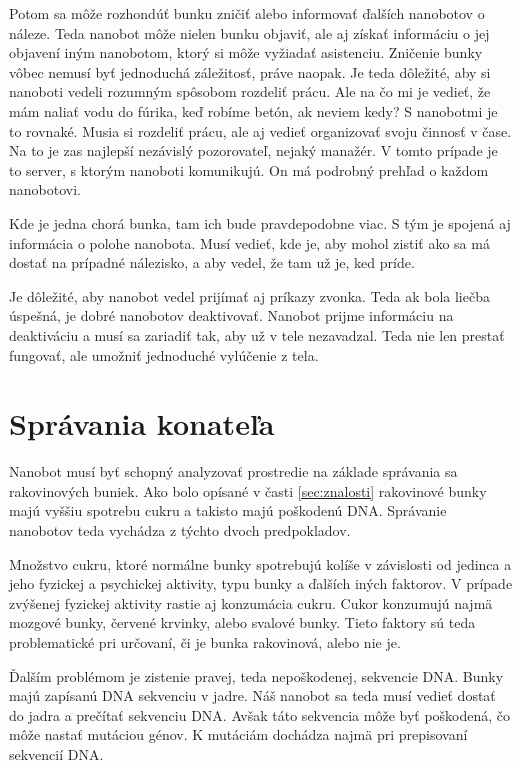 \documentclass[10pt,twoside,slovak,a4paper]{article}
\begin{document}
Potom sa môže rozhondúť bunku zničiť alebo informovať ďalších nanobotov o náleze. Teda nanobot môže nielen bunku objaviť, ale aj získať informáciu o jej objavení iným nanobotom, ktorý si môže vyžiadať asistenciu. Zničenie bunky vôbec nemusí byť jednoduchá záležitosť, práve naopak. Je teda dôležité, aby si nanoboti vedeli rozumným spôsobom rozdeliť prácu. Ale na čo mi je vedieť, že mám naliať vodu do fúrika, keď robíme betón, ak neviem kedy? S nanobotmi je to rovnaké. Musia si rozdeliť prácu, ale aj vedieť organizovať svoju činnosť v čase. Na to je zas najlepší nezávislý pozorovateľ, nejaký manažér. V tomto prípade je to server, s ktorým nanoboti komunikujú. On má podrobný prehľad o každom nanobotovi. 

Kde je jedna chorá bunka, tam ich bude pravdepodobne viac. S tým je spojená aj informácia o polohe nanobota. Musí vedieť, kde je, aby mohol zistiť ako sa má dostať na prípadné nálezisko, a aby vedel, že tam už je, ked príde.

Je dôležité, aby nanobot vedel prijímať aj príkazy zvonka. Teda ak bola liečba úspešná, je dobré nanobotov deaktivovať. Nanobot prijme informáciu na deaktiváciu a musí sa zariadiť tak, aby už v tele nezavadzal. Teda nie len prestať fungovať, ale umožniť jednoduché vylúčenie z tela.

\section{Správania konateľa}
\label{sec:spravanie}
Nanobot musí byť schopný analyzovať prostredie na základe správania sa rakovinových buniek. Ako bolo opísané v časti \ref{sec:znalosti} rakovinové bunky majú vyššiu spotrebu cukru a takisto majú poškodenú DNA. Správanie nanobotov teda vychádza z týchto dvoch predpokladov.

Množstvo cukru, ktoré normálne bunky spotrebujú kolíše v závislosti od jedinca a jeho fyzickej a psychickej aktivity, typu bunky a ďalších iných faktorov. V prípade zvýšenej fyzickej aktivity rastie aj konzumácia cukru. Cukor konzumujú najmä mozgové bunky, červené krvinky, alebo svalové bunky. Tieto faktory sú teda problematické pri určovaní, či je bunka rakovinová, alebo nie je.

Ďalším problémom je zistenie pravej, teda nepoškodenej, sekvencie DNA. Bunky majú zapísanú DNA sekvenciu v jadre. Náš nanobot sa teda musí vedieť dostať do jadra a prečítať sekvenciu DNA. Avšak táto sekvencia môže byť poškodená, čo môže nastať mutáciou génov. K mutáciám dochádza najmä pri prepisovaní sekvencií DNA.
\cite{Wikipedia-glukoza, Wikipedia-jadro, Wikipedia-mutations}
\end{document}
